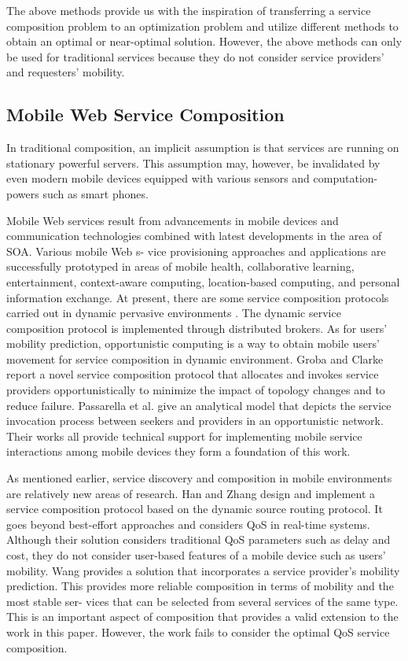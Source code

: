 \documentclass[10pt,journal,compsoc]{IEEEtran}
\begin{document}
The above methods provide us with the inspiration of transferring a service composition problem to an optimization problem and utilize different methods to obtain an optimal or near-optimal solution. However, the above methods can only be used for traditional services because they do not consider service providers’ and requesters’ mobility.

\subsection{Mobile Web Service Composition}
In traditional composition, an implicit assumption is that services are running on stationary powerful servers. This assumption may, however, be invalidated by even modern mobile devices equipped with various sensors and computation-powers such as smart phones.

Mobile Web services result from advancements in mobile devices and communication technologies combined with latest developments in the area of SOA. Various mobile Web s- vice provisioning approaches and applications are successfully prototyped in areas of mobile health, collaborative learning, entertainment, context-aware computing, location-based computing, and personal information exchange. At present, there are some service composition protocols carried out in dynamic pervasive environments \cite{kalasapur2007dynamic}. The dynamic service composition protocol is implemented through distributed brokers. As for users’ mobility prediction, opportunistic computing is a way to obtain mobile users’ movement for service composition in dynamic environment. Groba and Clarke \cite{groba2014opportunistic} report a novel service composition protocol that allocates and invokes service providers opportunistically to minimize the impact of topology changes and to reduce failure. Passarella et al. \cite{passarella2010performance} give an analytical model that depicts the service invocation process between seekers and providers in an opportunistic network. Their works all provide technical support for implementing mobile service interactions among mobile devices they form a foundation of this work.

As mentioned earlier, service discovery and composition in mobile environments are relatively new areas of research. Han and Zhang \cite{han2010design} design and implement a service composition protocol based on the dynamic source routing protocol. It goes beyond best-effort approaches and considers QoS in real-time systems. Although their solution considers traditional QoS parameters such as delay and cost, they do not consider user-based features of a mobile device such as users’ mobility. Wang \cite{wang2011exploiting} provides a solution that incorporates a service provider’s mobility prediction. This provides more reliable composition in terms of mobility and the most stable ser- vices that can be selected from several services of the same type. This is an important aspect of composition that provides a valid extension to the work in this paper. However, the work \cite{wang2011exploiting} fails to consider the optimal QoS service composition.
\end{document}
